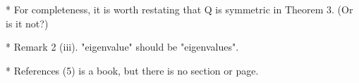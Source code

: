 \documentclass[12pt]{article}
\newenvironment{reply}{$\triangleright$\bfseries}{$\triangleleft$}
\renewenvironment{quote}
               {\list{}{\rightmargin\leftmargin}%
                \item\relax\normalfont}
               {\endlist}
\newcommand{\ttheta}{\boldsymbol{\theta}}
\begin{document}
* For completeness, it is worth restating that Q is symmetric in Theorem 3. (Or is it not?) 

* Remark 2 (iii). "eigenvalue" should be "eigenvalues". 

* References (5) is a book, but there is no section or page.


%
%
%
%
%
%
%
%	
\end{document}
